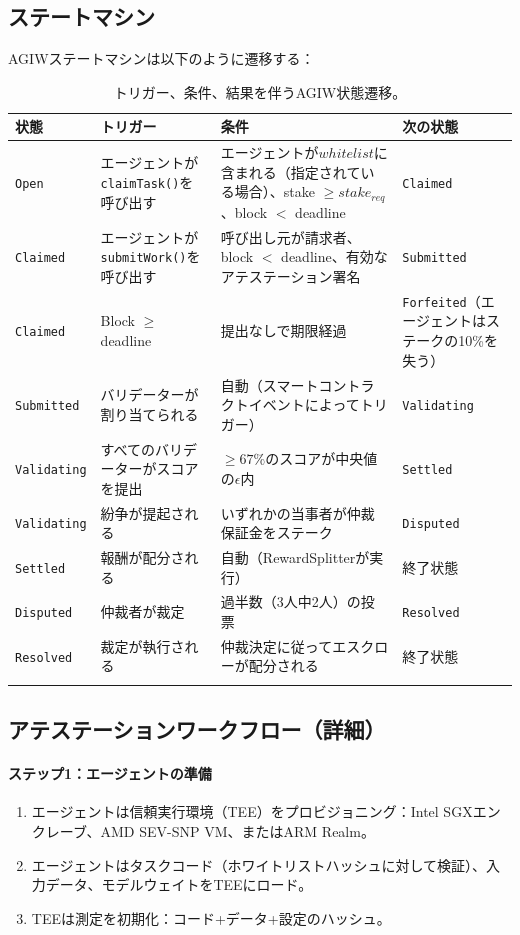 \documentclass[11pt]{article}
\begin{document}
\subsection{ステートマシン}
\label{sec:agiw-state-machine}
AGIWステートマシンは以下のように遷移する：
\begin{longtable}{@{}p{}p{}p{}p{}@{}}
\toprule
\textbf{状態} & \textbf{トリガー} & \textbf{条件} & \textbf{次の状態} \\\midrule
\texttt{Open} & エージェントが\texttt{claimTask()}を呼び出す & エージェントが$whitelist$に含まれる（指定されている場合）、stake $\geq stake_{req}$、block $<$ deadline & \texttt{Claimed} \\
\texttt{Claimed} & エージェントが\texttt{submitWork()}を呼び出す & 呼び出し元が請求者、block $<$ deadline、有効なアテステーション署名 & \texttt{Submitted} \\
\texttt{Claimed} & Block $\geq$ deadline & 提出なしで期限経過 & \texttt{Forfeited}（エージェントはステークの10\%を失う） \\
\texttt{Submitted} & バリデーターが割り当てられる & 自動（スマートコントラクトイベントによってトリガー） & \texttt{Validating} \\
\texttt{Validating} & すべてのバリデーターがスコアを提出 & $\geq 67\%$のスコアが中央値の$\epsilon$内 & \texttt{Settled} \\
\texttt{Validating} & 紛争が提起される & いずれかの当事者が仲裁保証金をステーク & \texttt{Disputed} \\
\texttt{Settled} & 報酬が配分される & 自動（RewardSplitterが実行） & 終了状態 \\
\texttt{Disputed} & 仲裁者が裁定 & 過半数（3人中2人）の投票 & \texttt{Resolved} \\
\texttt{Resolved} & 裁定が執行される & 仲裁決定に従ってエスクローが配分される & 終了状態 \\\bottomrule
\caption{トリガー、条件、結果を伴うAGIW状態遷移。}
\label{tab:agiw-states}
\end{longtable}

\subsection{アテステーションワークフロー（詳細）}
\label{sec:attestation-workflow}
\paragraph{ステップ1：エージェントの準備}
\begin{enumerate}[noitemsep]
  \item エージェントは信頼実行環境（TEE）をプロビジョニング：Intel SGXエンクレーブ、AMD SEV-SNP VM、またはARM Realm。
  \item エージェントはタスクコード（ホワイトリストハッシュに対して検証）、入力データ、モデルウェイトをTEEにロード。
  \item TEEは測定を初期化：コード+データ+設定のハッシュ。
\end{enumerate}
\end{document}

